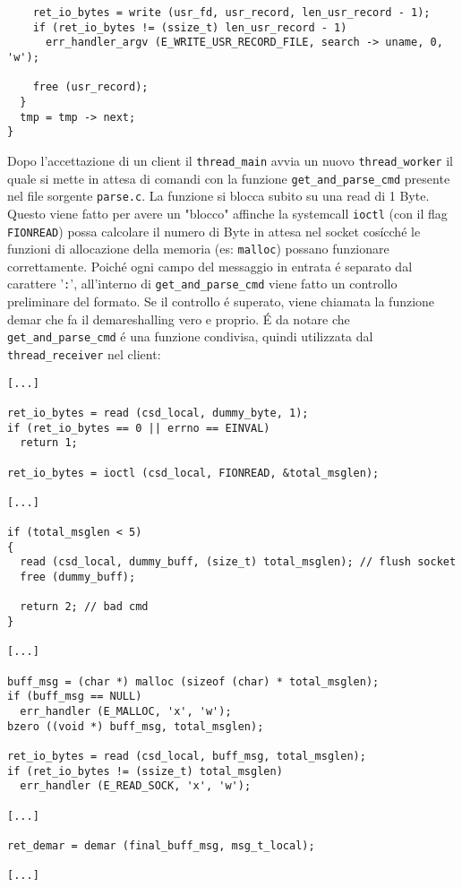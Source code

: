 \documentclass[12pt a4paper oneside]{article}
\begin{document}
{\begin{verbatim}
    ret_io_bytes = write (usr_fd, usr_record, len_usr_record - 1);
    if (ret_io_bytes != (ssize_t) len_usr_record - 1)
      err_handler_argv (E_WRITE_USR_RECORD_FILE, search -> uname, 0, 'w');

    free (usr_record);
  }
  tmp = tmp -> next;
}
			\end{verbatim}
			\par
			Dopo l'accettazione di un client il \texttt{thread\_main} avvia un nuovo \texttt{thread\_worker} il quale si mette in attesa di comandi con la funzione \texttt{get\_and\_parse\_cmd} presente nel file sorgente \texttt{parse.c}. La funzione si blocca subito su una read di 1 Byte. Questo viene fatto per avere un "blocco" affinche la systemcall \texttt{ioctl} (con il flag \texttt{FIONREAD}) possa calcolare il numero di Byte in attesa nel socket cos\'icch\'e le funzioni di allocazione della memoria (es: \texttt{malloc}) possano funzionare correttamente. Poich\'e ogni campo del messaggio in entrata \'e separato dal carattere '\texttt{:}', all'interno di \texttt{get\_and\_parse\_cmd} viene fatto un controllo preliminare del formato. Se il controllo \'e superato, viene chiamata la funzione demar che fa il demareshalling vero e proprio. \'E da notare che \texttt{get\_and\_parse\_cmd} \'e una funzione condivisa, quindi utilizzata dal \texttt{thread\_receiver} nel client:
			\begin{verbatim}
[...]

ret_io_bytes = read (csd_local, dummy_byte, 1);
if (ret_io_bytes == 0 || errno == EINVAL)
  return 1;

ret_io_bytes = ioctl (csd_local, FIONREAD, &total_msglen);

[...]

if (total_msglen < 5)
{
  read (csd_local, dummy_buff, (size_t) total_msglen); // flush socket
  free (dummy_buff);

  return 2; // bad cmd
}

[...]

buff_msg = (char *) malloc (sizeof (char) * total_msglen);
if (buff_msg == NULL)
  err_handler (E_MALLOC, 'x', 'w');
bzero ((void *) buff_msg, total_msglen);

ret_io_bytes = read (csd_local, buff_msg, total_msglen);
if (ret_io_bytes != (ssize_t) total_msglen)
  err_handler (E_READ_SOCK, 'x', 'w');
  
[...]

ret_demar = demar (final_buff_msg, msg_t_local);

[...]


\end{verbatim}}
\end{document}
